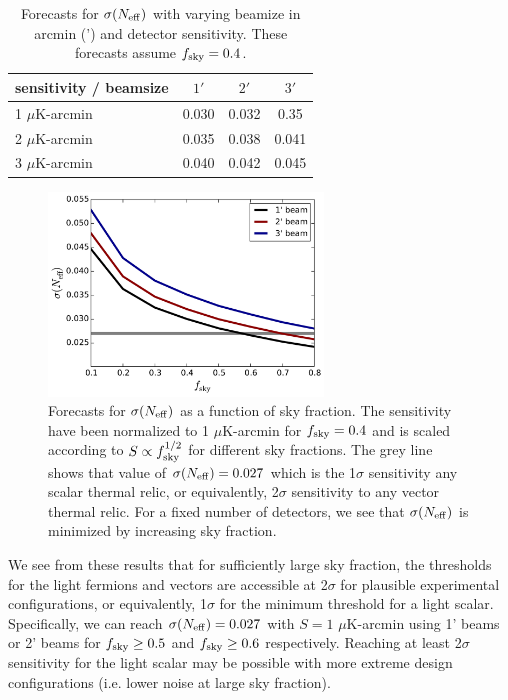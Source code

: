\begin{table}[t!]
\begin{center}
\begin{tabular}{l ccc} 
 \toprule
    		sensitivity / beamsize	    			& $1'$  		& $2'$  		& $3'$  		 \\ [0.5ex]
 \midrule
   1 $\mu$K-arcmin & 0.030 		& 0.032		& 0.35	 		  \\
  2  $\mu$K-arcmin & 0.035 		& 0.038		& 0.041	 		  \\
   3  $\mu$K-arcmin & 0.040 		& 0.042 		& 0.045	 		  \\
    \bottomrule
\end{tabular}
\caption{Forecasts for $\sigma(N_{\rm eff})$ with varying beamize in arcmin (') and detector sensitivity.  These forecasts assume $f_{\rm sky} = 0.4$.  }
\label{tab:Neffbeam}
\end{center}
\end{table}


\begin{figure}[t!]
\begin{center}
\includegraphics[width=0.65\textwidth]{Neutrinos/Nfsky.pdf}
\caption{Forecasts for $\sigma(N_{\rm eff})$ as a function of sky fraction.  The sensitivity have been normalized to 1 $\mu$K-arcmin for $f_{\rm sky} =0.4$ and is scaled according to $S \propto f_{\rm sky}^{1/2}$ for different sky fractions.  The grey line shows that value of $\sigma(N_{\rm eff}) =0.027$ which is the 1$\sigma$ sensitivity any scalar thermal relic, or equivalently, 2$\sigma$ sensitivity to any vector thermal relic.  For a fixed number of detectors, we see that $\sigma(N_{\rm eff})$ is minimized by increasing sky fraction.  }
\label{fig:Neff_fsky}
\end{center}
\end{figure} 


We see from these results that for sufficiently large sky fraction, the thresholds for the light fermions and vectors are accessible at 2$\sigma$ for plausible experimental configurations, or equivalently, 1$\sigma$ for the minimum threshold for a light scalar.  Specifically, we can reach $\sigma(N_{\rm eff}) = 0.027$ with $S = 1$ $\mu$K-arcmin using 1' beams or 2' beams for $f_{\rm sky} \geq 0.5$ and $f_{\rm sky} \geq 0.6$ respectively.  Reaching at least 2$\sigma$ sensitivity for the light scalar may be possible with more extreme design configurations (i.e. lower noise at large sky fraction).  

